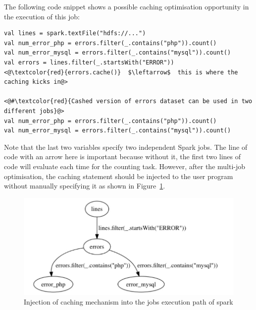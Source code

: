 \documentclass[conference]{sig-alternate-05-2015}
\begin{document}
The following code snippet shows a possible caching optimisation opportunity in the execution of this job:

\begin{lstlisting}[frame=single, caption=Possible Caching Example, label=code:example, breaklines=true]
val lines = spark.textFile("hdfs://...")
val num_error_php = errors.filter(_.contains("php")).count()
val num_error_mysql = errors.filter(_.contains("mysql")).count()
val errors = lines.filter(_.startsWith("ERROR"))
<@\textcolor{red}{errors.cache()}  $\leftarrow$  this is where the caching kicks in@>

<@#\textcolor{red}{Cashed version of errors dataset can be used in two different jobs}@>
val num_error_php = errors.filter(_.contains("php")).count()
val num_error_mysql = errors.filter(_.contains("mysql")).count()
\end{lstlisting} 

Note that the last two variables specify two independent Spark jobs. The line of code with an arrow here is important because without it, the first two lines of code will evaluate each time for the counting task. However, after the multi-job optimisation, the caching statement should be injected to the user program without manually specifying it as shown in Figure~\ref{fig:example}. 

\begin{figure}[htbp]
	\centering	 
		\includegraphics[width=0.95\columnwidth]{images/1.JPEG}
	\caption{Injection of caching mechanism into the jobs execution path of spark}
	\label{fig:example}
\end{figure}
\end{document}
